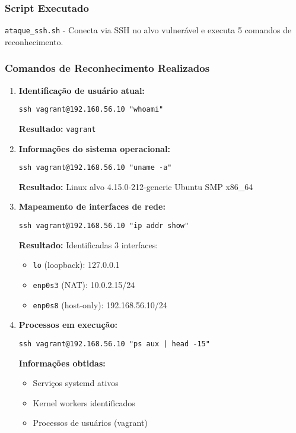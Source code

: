 \documentclass[12pt]{article}
\begin{document}
\subsubsection{Script Executado}
\texttt{ataque\_ssh.sh} - Conecta via SSH no alvo vulnerável e executa 5 comandos de reconhecimento.

\subsubsection{Comandos de Reconhecimento Realizados}

\begin{enumerate}
    \item \textbf{Identificação de usuário atual:}
        \begin{verbatim}
ssh vagrant@192.168.56.10 "whoami"
        \end{verbatim}
        \textbf{Resultado:} \texttt{vagrant}
    
    \item \textbf{Informações do sistema operacional:}
        \begin{verbatim}
ssh vagrant@192.168.56.10 "uname -a"
        \end{verbatim}
        \textbf{Resultado:} Linux alvo 4.15.0-212-generic Ubuntu SMP x86\_64
    
    \item \textbf{Mapeamento de interfaces de rede:}
        \begin{verbatim}
ssh vagrant@192.168.56.10 "ip addr show"
        \end{verbatim}
        \textbf{Resultado:} Identificadas 3 interfaces:
        \begin{itemize}
            \item \texttt{lo} (loopback): 127.0.0.1
            \item \texttt{enp0s3} (NAT): 10.0.2.15/24
            \item \texttt{enp0s8} (host-only): 192.168.56.10/24
        \end{itemize}
    
    \item \textbf{Processos em execução:}
        \begin{verbatim}
ssh vagrant@192.168.56.10 "ps aux | head -15"
        \end{verbatim}
        \textbf{Informações obtidas:}
        \begin{itemize}
            \item Serviços systemd ativos
            \item Kernel workers identificados
            \item Processos de usuários (vagrant)
        \end{itemize}
    

\end{enumerate}
\end{document}
